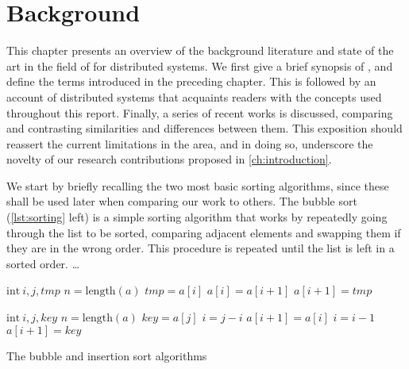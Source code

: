 \chapter{Background}\label{ch:background}

This chapter presents an overview of the background literature and state of the art in the field of \RV for distributed systems. 
%
We first give a brief synopsis of \RV, and define the terms introduced in the preceding chapter.
%
This is followed by an account of distributed systems that acquaints readers with the concepts used throughout this report.
%
Finally, a series of recent works is discussed, comparing and contrasting similarities and differences between them.
%
This exposition should reassert the current limitations in the area, and in doing so, underscore the novelty of our research contributions proposed in \cref{ch:introduction}.

We start by briefly recalling the two most basic sorting algorithms, since these shall be used later when comparing our work to others.
%
The bubble sort (\cref{lst:sorting} left) is a simple sorting algorithm that works by repeatedly going through the list to be sorted, comparing adjacent elements and swapping them if they are in the wrong order.
%
This procedure is repeated until the list is left in a sorted order.
%
\ldots

\begin{algorithm}[!b]
  \begin{minipage}[t]{\algcolwidth}
    \begin{algorithmic}[1]
        \State $\mathrm{int~} i, j, tmp$
        \State $n = \mathrm{length}(a)$
            \Statex {}
              \State $tmp = a[i]$
              \State $a[i] = a[i + 1]$
              \State $a[i + 1] = tmp$
            \EndIf
          \EndFor
        \EndFor
      \EndProcedure
    \end{algorithmic}
  \end{minipage}
  \hfill
  \begin{minipage}[t]{\algcolwidth}
    \begin{algorithmic}[1]
        \State $\mathrm{int~} i, j, key$
        \State $n = \mathrm{length}(a)$
          \State $key=a[j]$
          \State $i=j-i$
          \Statex {}
            \State $a[i+1] = a[i]$
            \State $i=i-1$
          \EndWhile
          \State $a[i+1] = key$
        \EndFor
      \EndProcedure
    \end{algorithmic}
  \end{minipage}
  \caption{The bubble and insertion sort algorithms}\label{lst:sorting}
\end{algorithm}


